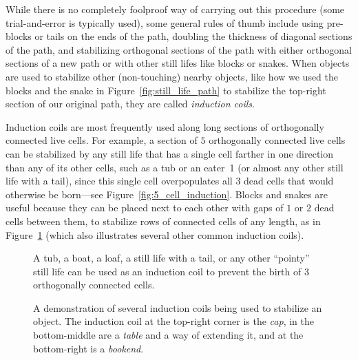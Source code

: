 While there is no completely foolproof way of carrying out this procedure (some trial-and-error is typically used), some general rules of thumb include using pre-blocks or tails on the ends of the path, doubling the thickness of diagonal sections of the path, and stabilizing orthogonal sections of the path with either orthogonal sections of a new path or with other still lifes like blocks or snakes. When objects are used to stabilize other (non-touching) nearby objects, like how we used the blocks and the snake in Figure~\ref{fig:still_life_path} to stabilize the top-right section of our original path, they are called \emph{induction coils}.

Induction coils are most frequently used along long sections of orthogonally connected live cells. For example, a section of $5$ orthogonally connected live cells can be stabilized by any still life that has a single cell farther in one direction than any of its other cells, such as a tub or an eater~1 (or almost any other still life with a tail), since this single cell overpopulates all $3$ dead cells that would otherwise be born---see Figure~\ref{fig:5_cell_induction}. Blocks and snakes are useful because they can be placed next to each other with gaps of $1$ or $2$ dead cells between them, to stabilize rows of connected cells of any length, as in Figure~\ref{fig:induction_coil_examples} (which also illustrates several other common induction coils).

\begin{figure}[!htb]
	\centering
	\begin{minipage}{.31\textwidth}
		\centering
		\caption{A tub, a boat, a loaf, a still life with a tail, or any other ``pointy'' still life can be used as an induction coil to prevent the birth of $3$ orthogonally connected cells.}
		\label{fig:5_cell_induction}
	\end{minipage} \quad %
	\begin{minipage}{.64\textwidth}
		\centering
		\caption{A demonstration of several induction coils being used to stabilize an object. The induction coil at the top-right corner is the \emph{cap}, in the bottom-middle are a \emph{table} and a way of extending it, and at the bottom-right is a \emph{bookend}.}
		\label{fig:induction_coil_examples}
	\end{minipage}
\end{figure}


